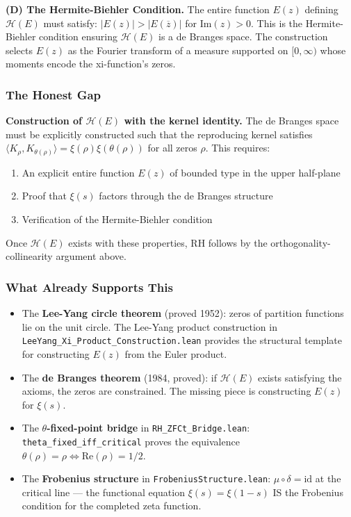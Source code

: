 \documentclass[10pt,a4paper]{article}
\begin{document}
\textbf{(D) The Hermite-Biehler Condition.} The entire function $E(z)$ defining $\mathcal{H}(E)$ must satisfy: $|E(z)| > |E(\overline{z})|$ for $\text{Im}(z) > 0$. This is the Hermite-Biehler condition ensuring $\mathcal{H}(E)$ is a de Branges space. The construction selects $E(z)$ as the Fourier transform of a measure supported on $[0,\infty)$ whose moments encode the xi-function's zeros.

\subsubsection{The Honest Gap}

\textbf{Construction of $\mathcal{H}(E)$ with the kernel identity.} The de Branges space must be explicitly constructed such that the reproducing kernel satisfies $\langle K_{\rho}, K_{\theta(\rho)} \rangle = \xi(\rho)\xi(\theta(\rho))$ for all zeros $\rho$. This requires:

\begin{enumerate}
    \item An explicit entire function $E(z)$ of bounded type in the upper half-plane
    \item Proof that $\xi(s)$ factors through the de Branges structure
    \item Verification of the Hermite-Biehler condition
\end{enumerate}

Once $\mathcal{H}(E)$ exists with these properties, RH follows by the orthogonality-collinearity argument above.

\subsubsection{What Already Supports This}

\begin{itemize}
    \item The \textbf{Lee-Yang circle theorem} (proved 1952): zeros of partition functions lie on the unit circle. The Lee-Yang product construction in \texttt{LeeYang\_\allowbreak Xi\_\allowbreak Product\_\allowbreak Construction.\allowbreak lean} provides the structural template for constructing $E(z)$ from the Euler product.
    \item The \textbf{de Branges theorem} (1984, proved): if $\mathcal{H}(E)$ exists satisfying the axioms, the zeros are constrained. The missing piece is constructing $E(z)$ for $\xi(s)$.
    \item The \textbf{$\theta$-fixed-point bridge} in \texttt{RH\_\allowbreak ZFCt\_\allowbreak Bridge.\allowbreak lean}: \texttt{theta\_\allowbreak fixed\_\allowbreak iff\_\allowbreak critical} proves the equivalence $\theta(\rho) = \rho \iff \text{Re}(\rho) = 1/2$.
    \item The \textbf{Frobenius structure} in \texttt{FrobeniusStructure.\allowbreak lean}: $\mu \circ \delta = \text{id}$ at the critical line --- the functional equation $\xi(s) = \xi(1-s)$ IS the Frobenius condition for the completed zeta function.
\end{itemize}
\end{document}

